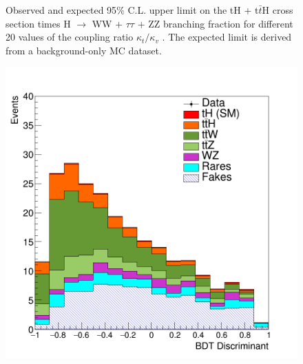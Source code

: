 \documentclass[11pt]{beamer}
\begin{document}
{\begin{frame}
\begin{minipage}[c]{.45\textwidth}
\begin{figure}
	\caption*{\tiny{Observed and expected 95$\%$ C.L. upper limit on the tH + t$\bar{t}$H cross section times H $\rightarrow$ WW $+$ $\tau\tau$ $+$ ZZ branching fraction for different 20 values of the coupling ratio $\kappa_t /\kappa_v$ . The expected limit is derived from a background-only MC dataset.}}
	\end{figure}
\end{minipage}
\end{frame}
}

\begin{frame}
\begin{minipage}[b]{.48\textwidth}
\begin{figure}
	\centering
	\includegraphics[width=\textwidth]{figures/kos.png}
\end{figure}
\end{minipage}
\hfill
\begin{minipage}[b]{.48\textwidth}
	\begin{figure}
		\centering

\end{figure}
\end{minipage}
\end{frame}
\end{document}
